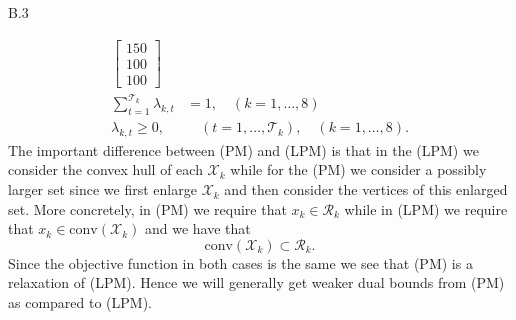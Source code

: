 \documentclass[a4paper]{article}
\begin{document}
\begin{exercise}{B.3}
\begin{enumerate}[label=(\roman*)]
\begin{align*}
\begin{bmatrix}
            150 \\
            100 \\
            100
          \end{bmatrix} \\
            \sum_{t = 1}^{\mathcal{T}_k} \lambda_{k,t} &= 1, \quad (k = 1,\ldots, 8) \\
            \lambda_{k,t} \geq 0,& \quad (t=1, \ldots, \mathcal{T}_k), \quad (k = 1,\ldots, 8)
        .\end{align*}
        The important difference between (PM) and (LPM) is that in the (LPM) we consider the convex hull of each $ \mathscr{X}_k $ while for the (PM) we consider a possibly larger set since we first enlarge $ \mathscr{X}_k $ and then consider the vertices of this enlarged set. More concretely, in (PM) we require that $ x_k \in \mathscr{R}_k $ while in (LPM) we require that $ x_k \in \text{conv}(\mathscr{X}_k) $ and we have that
        \begin{equation*}
          \text{conv}(\mathscr{X}_k) \subset \mathscr{R}_k
        .\end{equation*}
        Since the objective function in both cases is the same we see that (PM) is a relaxation of (LPM). Hence we will generally get weaker dual bounds from (PM) as compared to (LPM).
    \end{enumerate}
  \end{exercise}
\end{document}
